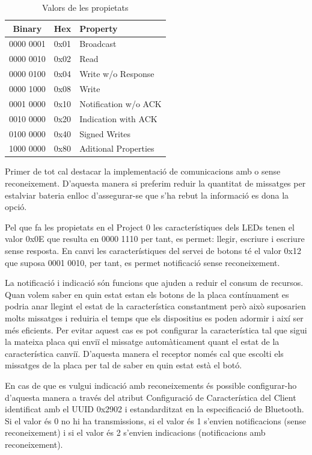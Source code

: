 \begin{table}
	\begin{center}
		\begin{tabular}{|c|c|l|}
			\hline
			Binary	&	Hex		&	Property	\\	\hline
			0000 0001	&	0x01	&	Broadcast\\	\hline
			0000 0010	&	0x02	&	Read	\\	\hline
			0000 0100	&	0x04	&	Write w/o Response	\\	\hline
			0000 1000	&	0x08	&	Write	\\	\hline
			0001 0000	&	0x10	&	Notification w/o ACK	\\	\hline
			0010 0000	&	0x20	&	Indication with ACK	\\	\hline
			0100 0000	&	0x40	&	Signed Writes	\\	\hline
			1000 0000	&	0x80	&	Aditional Properties	\\	\hline
		\end{tabular}
	\end{center}
\caption{Valors de les propietats}
\end{table}


Primer de tot cal destacar la implementació de comunicacions amb o sense reconeixement. D'aquesta manera si preferim reduir la quantitat de missatges per estalviar bateria enlloc d'assegurar-se que s'ha rebut la informació es dona la opció.

Pel que fa les propietats en el Project 0 les característiques dels LEDs tenen el valor 0x0E que resulta en 0000 1110 per tant, es permet: llegir, escriure i escriure sense resposta.
En canvi les característiques del servei de botons té el valor 0x12 que suposa 0001 0010, per tant, es permet notificació sense reconeixement.

La notificació i indicació són funcions que ajuden a reduir el consum de recursos.
Quan volem saber en quin estat estan els botons de la placa contínuament es podria anar llegint el estat de la característica constantment però això suposarien molts missatges i reduiria el temps que els dispositius es poden adormir i així ser més eficients.
Per evitar aquest cas es pot configurar la característica tal que sigui la mateixa placa qui enviï el missatge automàticament quant el estat de la característica canviï.
D'aquesta manera el receptor només cal que escolti els missatges de la placa per tal de saber en quin estat està el botó.

En cas de que es vulgui indicació amb reconeixements és possible configurar-ho d'aquesta manera a través del atribut Configuració de Característica del Client identificat amb el UUID 0x2902 i estandarditzat en la especificació de Bluetooth.
Si el valor és 0 no hi ha transmissions, si el valor és 1 s'envien notificacions (sense reconeixement) i si el valor és 2 s'envien indicacions (notificacions amb reconeixement). 

